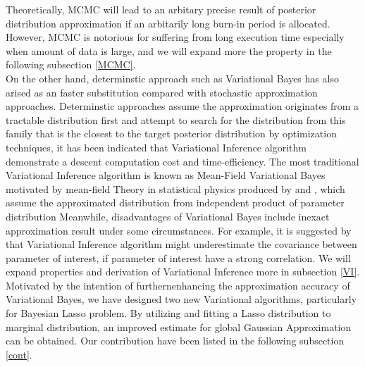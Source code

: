 Theoretically, MCMC will lead to an arbitary precise result of posterior distribution approximation if an arbitarily long burn-in period is allocated. However, MCMC is notorious for suffering from long execution time especially when amount of data is large, and we will expand more the property in the following subsection \ref{MCMC}.\\
On the other hand, determinstic approach such as Variational Bayes has also arised as an faster substitution compared with stochastic approximation approaches. Determinstic approaches assume the approximation originates from a tractable distribution first and attempt to search for the distribution from this family that is the closest to the target posterior distribution by optimization techniques, it has been indicated that Variational Inference algorithm demonstrate a descent computation cost and time-efficiency. 
The most traditional Variational Inference algorithm is known as Mean-Field Variational Bayes motivated by mean-field Theory in statistical physics produced by 
\cite{jordan_ghahramani_jaakkola_saul_1998} and \cite{attias_1999}, which assume the approximated distribution from independent product of parameter distribution
Meanwhile, disadvantages of Variational Bayes include inexact approximation result under some circumstances. For example, it is suggested by \cite{Bishop_2006} that Variational Inference algorithm might underestimate the covariance between parameter of interest, if parameter of interest have a strong correlation. We will expand properties and derivation of Variational Inference more in subsection \ref{VI}.\\
Motivated by the intention of furthernenhancing the approximation accuracy of Variational Bayes, we have designed two new Variational algorithms, particularly for Bayesian Lasso problem. By utilizing and fitting a Lasso distribution to marginal distribution, an improved estimate for global Gaussian Approximation can be obtained. Our contribution have been listed in the following subsection \ref{cont}.\\


